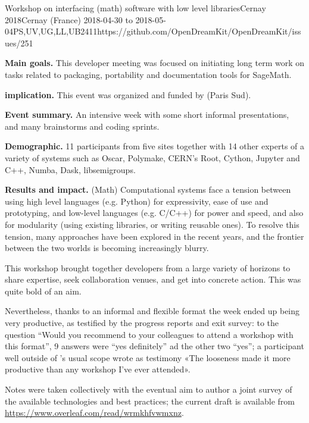 \begin{event}{Workshop on interfacing (math) software with low level libraries}{Cernay 2018}{Cernay (France) 2018-04-30 to 2018-05-04}{PS,UV,UG,LL,UB}{24}{11}{https://github.com/OpenDreamKit/OpenDreamKit/issues/251}

  \textbf{Main goals.} This developer meeting was focused on
  initiating long term work on \ODK tasks related to packaging,
  portability and documentation tools for SageMath.

  \textbf{\ODK implication.} This event was organized and funded by
  \ODK (Paris Sud).

  \textbf{Event summary.} An intensive week with some short informal
  presentations, and many brainstorms and coding sprints.

  \textbf{Demographic.} 11 \ODK participants from five sites together
  with 14 other experts of a variety of systems such as Oscar,
  Polymake, CERN's Root, Cython, Jupyter and C++, Numba, Dask,
  libsemigroups.

  \textbf{Results and impact.} (Math) Computational systems face a
  tension between using high level languages (e.g. Python) for
  expressivity, ease of use and prototyping, and low-level languages
  (e.g. C/C++) for power and speed, and also for modularity (using
  existing libraries, or writing reusable ones). To resolve this
  tension, many approaches have been explored in the recent years, and
  the frontier between the two worlds is becoming increasingly blurry.

  This workshop brought together developers from a large variety of
  horizons to share expertise, seek collaboration venues, and get into
  concrete action. This was quite bold of an aim.

  Nevertheless, thanks to an informal and flexible format the week
  ended up being very productive, as testified by the progress reports
  and exit survey: to the question “Would you recommend to your
  colleagues to attend a workshop with this format”, 9 answers were
  ``yes definitely'' ad the other two ``yes''; a participant well
  outside of \ODK's usual scope wrote as testimony «The looseness made
  it more productive than any workshop I've ever attended».

  Notes were taken collectively with the eventual aim to author a
  joint survey of the available technologies and best practices; the
  current draft is available from
  \url{https://www.overleaf.com/read/wrmkhfvwmxnz}.


\end{event}
